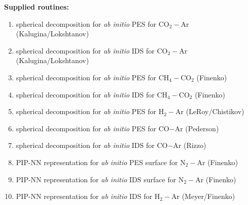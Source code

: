 \documentclass[color]{article}
\begin{document}
\noindent
\textbf{Supplied routines:}
\begin{enumerate}
    \item spherical decomposition for \textit{ab initio} PES for CO$_2-$Ar (Kalugina/Lokshtanov) 
    \item spherical decomposition for \textit{ab initio} IDS for CO$_2-$Ar (Kalugina/Lokshtanov)
    \item spherical decomposition for \textit{ab initio} PES for CH$_4-$CO$_2$ (Finenko)
    \item spherical decomposition for \textit{ab initio} IDS for CH$_4-$CO$_2$ (Finenko)
    \item spherical decomposition for \textit{ab initio} PES for H$_2-$Ar (LeRoy/Chistikov)
    \item spherical decomposition for \textit{ab initio} PES for CO$-$Ar (Pederson)
    \item spherical decomposition for \textit{ab initio} IDS for CO$-$Ar (Rizzo)
    \item PIP-NN representation for \textit{ab initio} PES surface for N$_2-$Ar (Finenko)
    \item PIP-NN representation for \textit{ab initio} IDS surface for N$_2-$Ar (Finenko)
    \item PIP-NN representation for \textit{ab initio} IDS for H$_2-$Ar (Meyer/Finenko)
\end{enumerate}
\end{document}
